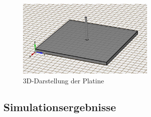 \begin{figure}[htbp]
	\centering
	\includegraphics[width=0.6\textwidth]{pic/Simulationen/3D.JPG}
	\caption{3D-Darstellung der Platine}
	\label{fig:3Ddarstellung}
\end{figure}

\subsection{Simulationsergebnisse}

